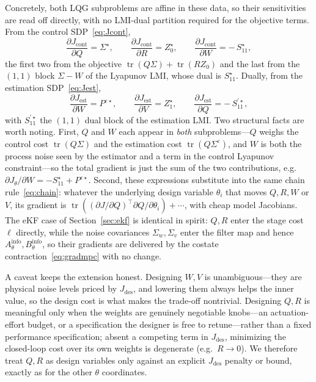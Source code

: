 \documentclass[twocolumn,amsthm]{autart}
\begin{document}
Concretely, both LQG subproblems are affine in these data, so their sensitivities
are read off directly, with no LMI-dual partition required for the objective
terms. From the control SDP~\eqref{eq:Jcont},
\begin{equation}\label{eq:gradQRcont}
\frac{\partial J_{\mathrm{cont}}}{\partial Q} = \Sigma^\star,\qquad
\frac{\partial J_{\mathrm{cont}}}{\partial R} = Z_0^\star,\qquad
\frac{\partial J_{\mathrm{cont}}}{\partial W} = -\,S_{11}^\star,
\end{equation}
the first two from the objective $\operatorname{tr}(Q\Sigma)+\operatorname{tr}(RZ_0)$ and the
last from the $(1,1)$ block $\Sigma-W$ of the Lyapunov LMI, whose dual is
$S_{11}^\star$. Dually, from the estimation SDP~\eqref{eq:Jest},
\begin{equation}\label{eq:gradQRest}
\frac{\partial J_{\mathrm{est}}}{\partial W} = P^{\varepsilon\star},\qquad
\frac{\partial J_{\mathrm{est}}}{\partial V} = Z_1^\star,\qquad
\frac{\partial J_{\mathrm{est}}}{\partial Q} = -\,S_{11}^{\prime\star},
\end{equation}
with $S_{11}^{\prime\star}$ the $(1,1)$ dual block of the estimation LMI. Two
structural facts are worth noting. First, $Q$ and $W$ each appear in \emph{both}
subproblems---$Q$ weighs the control cost $\operatorname{tr}(Q\Sigma)$ and the estimation
cost $\operatorname{tr}(Q\Sigma^\varepsilon)$, and $W$ is both the process noise seen by the
estimator and a term in the control Lyapunov constraint---so the total gradient is
just the sum of the two contributions, e.g.\ $\partial J_\theta/\partial W =
-S_{11}^\star + P^{\varepsilon\star}$. Second, these expressions substitute into the
same chain rule~\eqref{eq:chain}: whatever the underlying design variable
$\theta_i$ that moves $Q,R,W$ or $V$, its gradient is
$\operatorname{tr}((\partial J/\partial Q)^\top \partial Q/\partial\theta_i) + \cdots$,
with cheap model Jacobians. The eKF case of Section~\ref{sec:ekf} is identical in
spirit: $Q,R$ enter the stage cost $\ell$ directly, while the noise covariances
$\Sigma_w, \Sigma_v$ enter the filter map and hence
$A_\theta^{\mathrm{info}}, B_\theta^{\mathrm{info}}$, so their gradients are
delivered by the costate contraction~\eqref{eq:gradmpc} with no change.

A caveat keeps the extension honest. Designing $W, V$ is unambiguous---they are
physical noise levels priced by $J_{\mathrm{des}}$, and lowering them always helps
the inner value, so the design cost is what makes the trade-off nontrivial.
Designing $Q, R$ is meaningful only when the weights are genuinely negotiable
knobs---an actuation-effort budget, or a specification the designer is free to
retune---rather than a fixed performance specification; absent a competing term in
$J_{\mathrm{des}}$, minimizing the closed-loop cost over its own weights is
degenerate (e.g.\ $R\to0$). We therefore treat $Q,R$ as design variables only
against an explicit $J_{\mathrm{des}}$ penalty or bound, exactly as for the other
$\theta$ coordinates.
\end{document}
